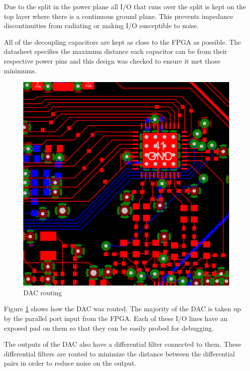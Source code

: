 \documentclass[crop=false]{standalone}
\begin{document}
        Due to the split in the power plane all I/O that runs over the split is kept on the top layer where there is a continuous ground plane. This prevents impedance discontinuities from radiating or making I/O susceptible to noise.
        
        All of the decoupling capacitors are kept as close to the FPGA as possible. The datasheet specifies the maximum distance each capacitor can be from their respective power pins and this design was checked to ensure it met those minimums.
        
        \pagebreak
        
        \begin{figure}[H]
            \centering
            \includegraphics[width=\textwidth]{M2RBDACRoute.PNG}
            \caption{DAC routing}
            \label{fig:M2RBDACRoute}
        \end{figure}
        
        Figure \ref{fig:M2RBDACRoute} shows how the DAC was routed. The majority of the DAC is taken up by the parallel port input from the FPGA. Each of these I/O lines have an exposed pad on them so that they can be easily probed for debugging.
        
        The outputs of the DAC also have a differential filter connected to them. These differential filters are routed to minimize the distance between the differential pairs in order to reduce noise on the output.
        
\end{document}
